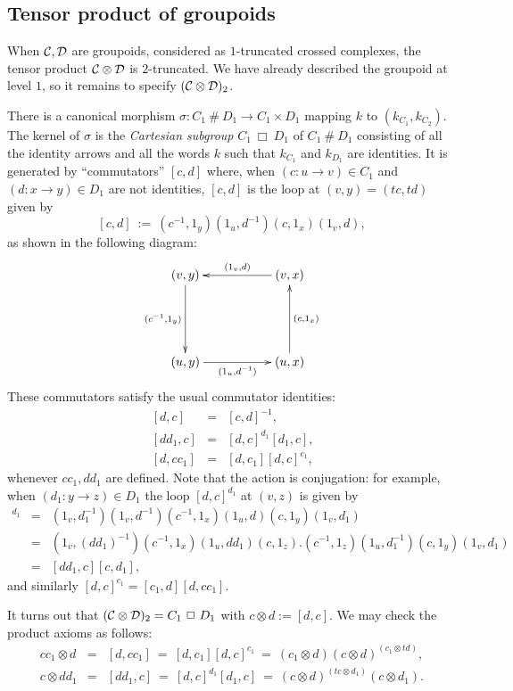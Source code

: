 \subsection{Tensor product of groupoids} \label{subsect:tensor-gpds}

When $\mathcal{C},\mathcal{D}$ are groupoids, considered as $1$-truncated crossed 
complexes, the tensor product $\mathcal{C}\otimes\mathcal{D}$ is $2$-truncated. 
We have already described the groupoid at level $1$, 
so it remains to specify $(\mathcal{C}\otimes\mathcal{D})_2$. 

There is a canonical morphism $\sigma : C_1\ \#\ D_1 \to C_1 \times D_1$ 
mapping $k$ to $(k_{C_1},k_{C_2})$. 
The kernel of $\sigma$ is the \emph{Cartesian subgroup} 
$C_1\ \Box\ D_1$ of $C_1\ \#\ D_1$ consisting of all the identity arrows 
and all the words $k$ such that $k_{C_1}$ and $k_{D_1}$ are identities. 
It is generated by ``commutators'' $[c,d]$ where, 
when $(c : u \to v) \in C_1$ and $(d : x \to y) \in D_1$ 
are not identities, $[c,d]$ is the loop at $(v,y)=(tc,td)$ given by 
$$
[c,d] ~:=~ (c^{-1},1_y)(1_u,d^{-1})(c,1_x)(1_v,d), 
$$
as shown in the following diagram:
$$
\xymatrix{ 
  (v,y) \ar[dd]_{(c^{-1},1_y)}
    &&  (v,x) \ar[ll]_{(1_v,d)} \\
    &&  \\
  (u,y) \ar[rr]_{(1_u,d^{-1})} 
    &&  (u,x) \ar[uu]_{(c,1_x)}  \\
}
$$
These commutators satisfy the usual commutator identities: 
\begin{eqnarray*}
\,    [d,c]  &=&  [c,d]^{-1}, \\ 
\, [dd_1,c]  &=&  [d,c]^{d_1}[d_1,c], \\
\, [d,cc_1]  &=&  [d,c_1][d,c]^{c_1},  
\end{eqnarray*}
whenever $cc_1,dd_1$ are defined. 
Note that the action is conjugation: for example, 
when $(d_1 : y \to z) \in D_1$ the loop $[d,c]^{d_1}$ at $(v,z)$ is given by 
\begin{eqnarray*}
[d,c]^{d_1} 
  &=& (1_v,d_1^{-1})(1_v,d^{-1})(c^{-1},1_x)(1_u,d)(c,1_y)(1_v,d_1) \\
  &=& (1_v,(dd_1)^{-1})(c^{-1},1_x)(1_u,dd_1)(c,1_z)
         .(c^{-1},1_z)(1_u,d_1^{-1})(c,1_y)(1_v,d_1) \\
  &=& [dd_1,c][c,d_1], 
\end{eqnarray*}
and similarly $[d,c]^{c_1} = [c_1,d][d,cc_1]$. 

It turns out that $(\mathcal{C}\otimes\mathcal{D})_2 = C_1\ \Box\ D_1$ 
with $c \otimes d := [d,c]$. 
We may check the product axioms as follows: 
\begin{eqnarray*}
cc_1 \otimes d &=& [d,cc_1] ~=~ [d,c_1][d,c]^{c_1} 
                   ~=~ (c_1 \otimes d)(c \otimes d)^{(c_1 \otimes td)}, \\
c \otimes dd_1 &=& [dd_1,c] ~=~ [d,c]^{d_1}[d_1,c] 
                   ~=~ (c \otimes d)^{(tc \otimes d_1)}(c \otimes d_1).
\end{eqnarray*}

